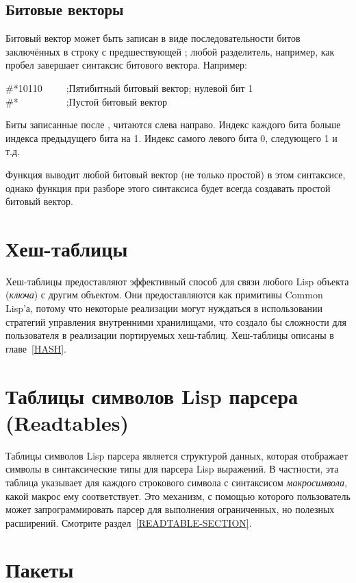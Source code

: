 \subsection{Битовые векторы}

Битовый вектор может быть записан в виде последовательности битов заключённых в
строку с предшествующей \cd{\#*}; любой разделитель, например, как пробел
завершает синтаксис битового вектора.
Например:
\begin{lisp}
\#*10110~~~~~;\textrm{Пятибитный битовый вектор; нулевой бит 1} \\
\#*~~~~~~~~~~;\textrm{Пустой битовый вектор}
\end{lisp}

Биты записанные после \cd{\#*}, читаются слева направо. Индекс каждого бита
больше индекса предыдущего бита на 1. Индекс самого левого бита 0, следующего 1
и т.д.

Функция  выводит любой битовый вектор (не только простой)
в этом синтаксисе, однако функция  при разборе этого синтаксиса будет
всегда создавать простой битовый вектор.

\section{Хеш-таблицы}

Хеш-таблицы предоставляют эффективный способ для связи любого Lisp объекта
(\emph{ключа}) с другим объектом. Они предоставляются как примитивы Common
Lisp'а, потому что некоторые реализации могут нуждаться в использовании
стратегий управления внутренними хранилищами, что создало бы сложности для
пользователя в реализации портируемых хеш-таблиц.
Хеш-таблицы описаны в главе~\ref{HASH}.

\section{Таблицы символов Lisp парсера (Readtables)}

Таблицы символов Lisp парсера является структурой данных, которая отображает
символы в синтаксические типы для парсера Lisp выражений.
В частности, эта таблица указывает для каждого строкового символа с синтаксисом
\emph{макросимвола}, какой макрос ему соответствует. Это механизм, с помощью
которого пользователь может запрограммировать парсер для выполнения
ограниченных, но полезных расширений.
Смотрите раздел~\ref{READTABLE-SECTION}.

\section{Пакеты}

